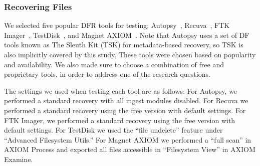 \subsubsection{Recovering Files}
\begin{paraphrase}
 We selected five popular DFR tools for testing: Autopsy~\cite{autopsy}, Recuva~\cite{recuva}, FTK Imager~\cite{ftk}, TestDisk~\cite{testdisk}, and Magnet AXIOM~\cite{axiom}. 
Note that Autopsy uses a set of DF tools known as The Sleuth Kit (TSK) for metadata-based recovery, so TSK is also implicitly covered by this study. 
These tools were chosen based on popularity and availability.
We also made sure to choose a combination of free and proprietary tools, in order to address one of the research questions.

The settings we used when testing each tool are as follows:
For Autopsy, we performed a standard recovery with all ingest modules disabled.
For Recuva we performed a standard recovery using the free version with default settings.
For FTK Imager, we performed a standard recovery using the free version with default settings.
For TestDisk we used the ``file undelete'' feature under ``Advanced Filesystem Utils.''
For Magnet AXIOM we performed a ``full scan'' in AXIOM Process and exported all files accessible in ``Filesystem View'' in AXIOM Examine.
\end{paraphrase}

